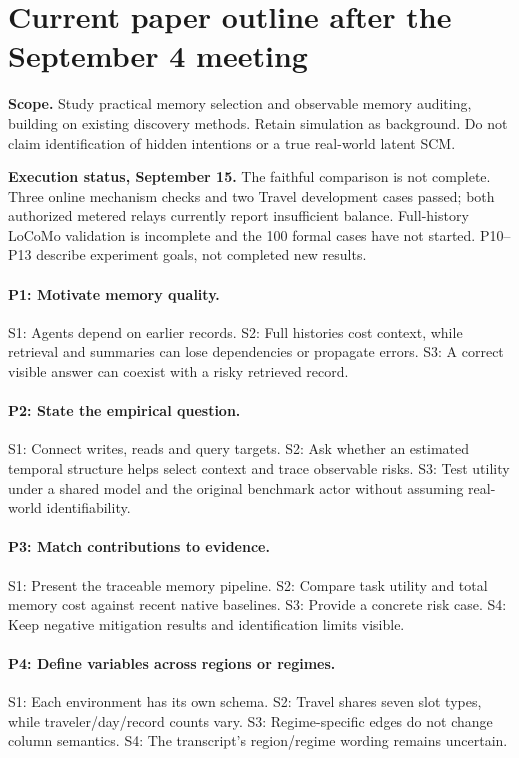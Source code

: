 \section*{Current paper outline after the September 4 meeting}
\label{sec:sept-outline}
\noindent\textbf{Scope.} Study practical memory selection and observable memory
auditing, building on existing discovery methods. Retain simulation as background.
Do not claim identification of hidden intentions or a true real-world latent SCM.

\noindent\textbf{Execution status, September 15.} The faithful comparison is not
complete. Three online mechanism checks and two Travel development cases passed;
both authorized metered relays currently report insufficient balance. Full-history
LoCoMo validation is incomplete and the 100 formal cases have not started.
P10--P13 describe experiment goals, not completed new results.

\paragraph{P1: Motivate memory quality.}
S1: Agents depend on earlier records. S2: Full histories cost context, while
retrieval and summaries can lose dependencies or propagate errors.
S3: A correct visible answer can coexist with a risky retrieved record.

\paragraph{P2: State the empirical question.}
S1: Connect writes, reads and query targets. S2: Ask whether an estimated temporal
structure helps select context and trace observable risks. S3: Test utility under
a shared model and the original benchmark actor without assuming real-world identifiability.

\paragraph{P3: Match contributions to evidence.}
S1: Present the traceable memory pipeline. S2: Compare task utility and total memory
cost against recent native baselines. S3: Provide a concrete risk case.
S4: Keep negative mitigation results and identification limits visible.

\paragraph{P4: Define variables across regions or regimes.}
S1: Each environment has its own schema. S2: Travel shares seven slot types, while
traveler/day/record counts vary. S3: Regime-specific edges do not change column
semantics. S4: The transcript's region/regime wording remains uncertain.

